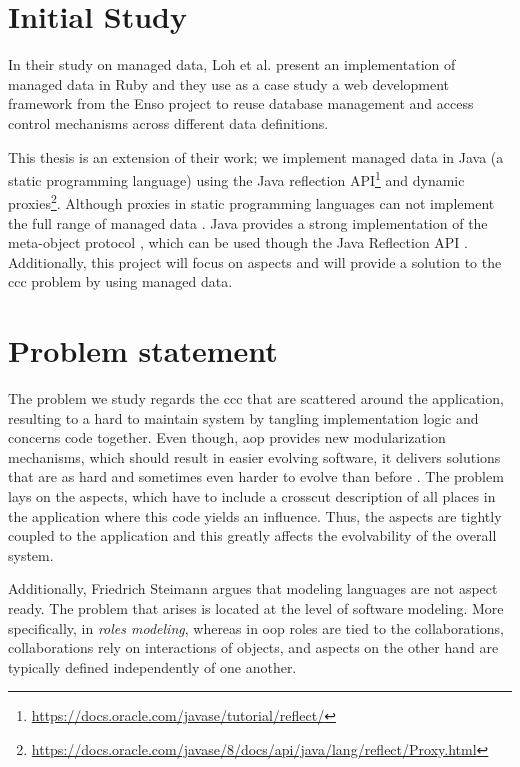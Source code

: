 \section{Initial Study}\label{Initial Study}
In their study on managed data, Loh et al. \cite{loh2012managed} present an implementation of managed data
in Ruby and they use as a case study a web development framework from the Enso project to reuse database management and 
access control mechanisms across different data definitions.

This thesis is an extension of their work; we implement managed data in Java (a static programming language) using the Java reflection API\footnote{\url{https://docs.oracle.com/javase/tutorial/reflect/}} and dynamic proxies\footnote{\url{https://docs.oracle.com/javase/8/docs/api/java/lang/reflect/Proxy.html}}. 
Although proxies in static programming languages can not implement the full range of managed data \cite{loh2012managed}. 
Java provides a strong implementation of the meta-object protocol \cite{kiczales1991art}, which can be used though the Java Reflection API \cite{forman2004java}. 
Additionally, this project will focus on aspects and will provide a solution to the \ac{ccc} problem by using managed data.

\section{Problem statement}\label{Problem statement}

The problem we study regards the \ac{ccc} that are scattered around the application, resulting to a hard to maintain system 
by tangling implementation logic and concerns code together.
Even though, \ac{aop} provides new modularization mechanisms, which should result in easier evolving software, 
it delivers solutions that are as hard and sometimes even harder to evolve than before \cite{tourwe2003existence}. 
The problem lays on the aspects, which have to include a crosscut description of all places in the application where this code yields an influence. 
Thus, the aspects are tightly coupled to the application and this greatly affects the evolvability of the overall system. 

Additionally, Friedrich Steimann \cite{steimann2005domain} argues that modeling languages are not aspect ready. 
The problem that arises is located at the level of software modeling. 
More specifically, in \textit{roles modeling}, whereas in \ac{oop} roles are tied to the collaborations,
collaborations rely on interactions of objects, and aspects on the other hand are typically defined independently of one another. 

